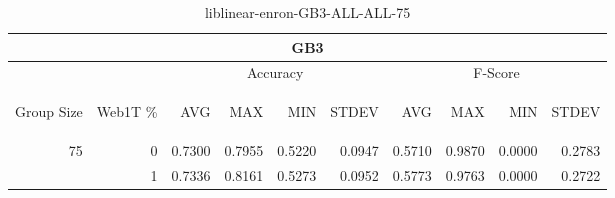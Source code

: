 \begin{center}
\begin{table}[htbp]
\begin{tabular}{ | r | r | r | r | r | r | r | r | r | r |}
\hline
\multicolumn{10}{|c|}{GB3}\\
\hline
 & & \multicolumn{4}{|c|}{Accuracy} & \multicolumn{4}{|c|}{F-Score}\\ \cline{3-10}
\begin{sideways}Group Size\end{sideways} & \begin{sideways}Web1T \%\end{sideways} & \begin{sideways}AVG\end{sideways} & \begin{sideways}MAX\end{sideways} & \begin{sideways}MIN\end{sideways} & \begin{sideways}STDEV\end{sideways} & \begin{sideways}AVG\end{sideways} & \begin{sideways}MAX\end{sideways} & \begin{sideways}MIN\end{sideways} & \begin{sideways}STDEV\end{sideways}\\
\hline
\multirow{1}{*}{75}
 & 0 & 0.7300 & 0.7955 & 0.5220 & 0.0947 & 0.5710 & 0.9870 & 0.0000 & 0.2783\\ \cline{2-10}
 & 1 & 0.7336 & 0.8161 & 0.5273 & 0.0952 & 0.5773 & 0.9763 & 0.0000 & 0.2722\\ \cline{2-10}
\hline
\end{tabular}
\caption{liblinear-enron-GB3-ALL-ALL-75}
\label{table:liblinear-enron-GB3-ALL-ALL-75}
\end{table}
\end{center}

